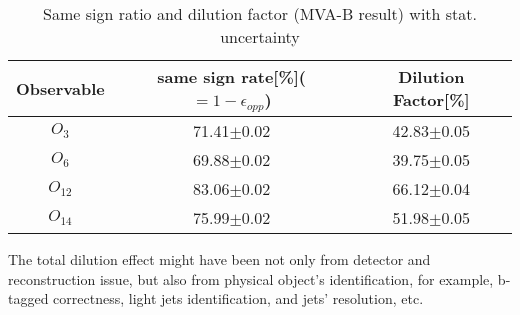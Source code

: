 		\begin{center}
		\setlength{\tabcolsep}{12pt}
		\begin{longtable}{ c | c c }
		\caption{Same sign ratio and dilution factor (MVA-B result) with stat. uncertainty} \\
		\hline
		Observable & same sign rate[\%]($=1-\epsilon_{opp}$) & Dilution Factor[\%] \\
		\hline
		$O_{3}$ & 71.41$\pm$0.02  &  42.83$\pm$0.05  \\
		$O_{6}$ &  69.88$\pm$0.02  &  39.75$\pm$0.05  \\
		$O_{12}$ &  83.06$\pm$0.02  &  66.12$\pm$0.04  \\
		$O_{14}$ &  75.99$\pm$0.02  &  51.98$\pm$0.05  \\
		\hline
		\end{longtable}
		\label{Dilution:tb:MVAB}
		\end{center}

		The total dilution effect might have been not only from detector and reconstruction issue, but also from physical object's identification, for example, b-tagged correctness, light jets identification, and jets' resolution, etc. 

\FloatBarrier
